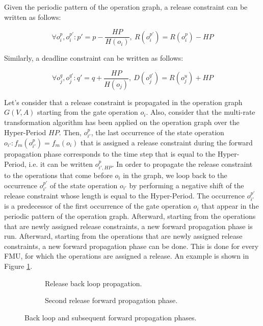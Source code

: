 Given the periodic pattern of the operation graph, a release constraint can be written as follows:

\begin{equation}
\forall o_i^p, o_i^{p'}: p' = p - \frac{HP}{H(o_i)},\ R(o_i^{p'}) = R(o_i^p) - HP
\label{eq:release}
\end{equation}

Similarly, a deadline constraint can be written as follows:

\begin{equation}
\forall o_j^q, o_j^{q'}: q' = q + \frac{HP}{H(o_j)},\ D(o_j^{q'}) = R(o_j^u) + HP
\label{eq:release}
\end{equation}

Let's consider that a release constraint is propagated in the operation graph $G(V,A)$ starting from the gate operation $o_i$.  Also, consider that the multi-rate transformation algorithm has been applied on the operation graph over the Hyper-Period $HP$. Then, $o_{i'}^p$, the last occurrence of the state operation $o_{i'}: f_m(o_{i'}^p) = f_m(o_i)$ that is assigned a release constraint during the forward propagation phase corresponds to the time step that is equal to the Hyper-Period, i.e. it can be written $o_{i',HP}^p$. In order to propagate the release constraint to the operations that come before $o_i$ in the graph, we loop back to the occurrence $o_{i'}^{p'}$ of the state operation $o_{i'}$ by performing a negative shift of the release constraint whose length is equal to the Hyper-Period. The occurrence $o_{i'}^{p'}$ is a predecessor of the first occurrence of the gate operation $o_i$ that appear in the periodic pattern of the operation graph. Afterward, starting from the operations that are newly assigned release constraints, a new forward propagation phase is run. Afterward, starting from the operations that are newly assigned release constraints, a new forward propagation phase can be done. This is done for every FMU, for which the operations are assigned a release. An example is shown in Figure \ref{fig:rloop}.

\begin{figure}[phtb]
\centering
\begin{subfigure}{\textwidth}
  \centering
  
  \caption{Release back loop propagation.}
  \label{fig:rloop}
\end{subfigure}

\begin{subfigure}{\textwidth}
  \centering
  
  \caption{Second release forward propagation phase.}
  \label{fig:bbve}
\end{subfigure}
\caption{Back loop and subsequent forward propagation phases.}
\label{fig:bbsim}
\end{figure}  

